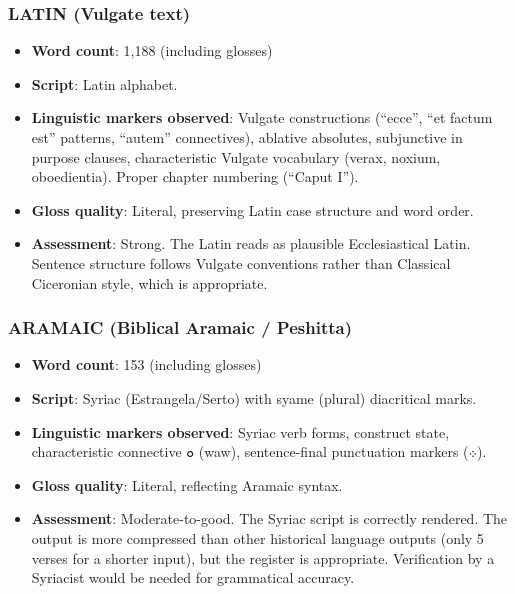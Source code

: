 \documentclass[10pt, letterpaper, twocolumn]{article}
\providecommand{\tightlist}{\setlength{\itemsep}{0pt}\setlength{\parskip}{0pt}}
\begin{document}
\subsubsection*{LATIN (Vulgate text)}\label{latin-vulgate-text}

\begin{itemize}
\tightlist
\item
  \textbf{Word count}: 1,188 (including glosses)
\item
  \textbf{Script}: Latin alphabet.
\item
  \textbf{Linguistic markers observed}: Vulgate constructions (``ecce'', ``et factum est'' patterns, ``autem'' connectives), ablative absolutes, subjunctive in purpose clauses, characteristic Vulgate vocabulary (verax, noxium, oboedientia). Proper chapter numbering (``Caput I'').
\item
  \textbf{Gloss quality}: Literal, preserving Latin case structure and word order.
\item
  \textbf{Assessment}: Strong. The Latin reads as plausible Ecclesiastical Latin. Sentence structure follows Vulgate conventions rather than Classical Ciceronian style, which is appropriate.
\end{itemize}

\subsubsection*{ARAMAIC (Biblical Aramaic / Peshitta)}\label{aramaic-biblical-aramaic-peshitta}

\begin{itemize}
\tightlist
\item
  \textbf{Word count}: 153 (including glosses)
\item
  \textbf{Script}: Syriac (Estrangela/Serto) with syame (plural) diacritical marks.
\item
  \textbf{Linguistic markers observed}: Syriac verb forms, construct state, characteristic connective ܘ (waw), sentence-final punctuation markers (܀).
\item
  \textbf{Gloss quality}: Literal, reflecting Aramaic syntax.
\item
  \textbf{Assessment}: Moderate-to-good. The Syriac script is correctly rendered. The output is more compressed than other historical language outputs (only 5 verses for a shorter input), but the register is appropriate. Verification by a Syriacist would be needed for grammatical accuracy.
\end{itemize}
\end{document}
